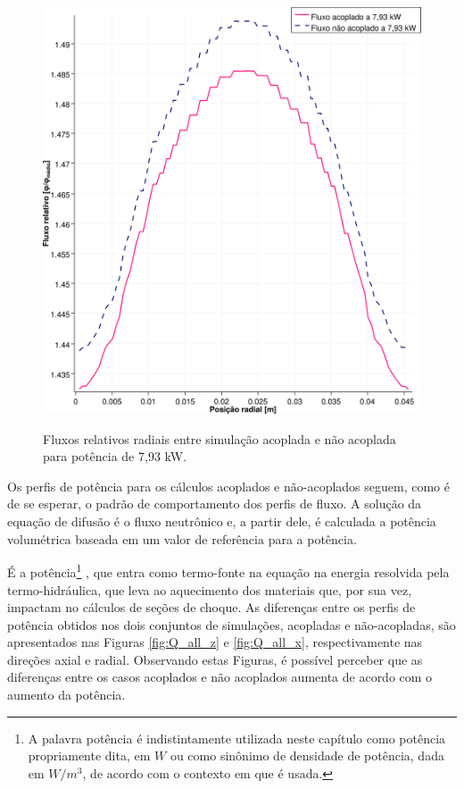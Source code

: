 \begin{figure}[htb]
  \caption{Fluxos relativos radiais entre simulação acoplada e não acoplada para
    potência de 7,93 kW.}
  \centering\includegraphics[scale=0.5]{figuras/Flux_rel_x_200_port.png}
  \label{fig:flux_x_200}
\end{figure}

Os perfis de potência para os cálculos acoplados e não-acoplados seguem, como
é de se esperar, o padrão de comportamento dos perfis de fluxo. A solução da
equação de difusão é o fluxo neutrônico e, a partir
dele, é calculada a potência volumétrica baseada em um valor de referência para
a potência.

É a potência\footnote{A palavra potência é indistintamente utilizada neste capítulo como potência
  propriamente dita, em $W$ ou como sinônimo de densidade de potência, dada em $W/m^3$, de acordo
  com o contexto em que é usada.}
, que entra como termo-fonte na equação na energia
resolvida pela termo-hidráulica, que leva ao aquecimento dos materiais que, por sua vez, impactam
no cálculos de seções de choque. As diferenças entre os perfis de potência obtidos nos dois conjuntos
de simulações, acopladas e não-acopladas, são apresentados nas Figuras \ref{fig:Q_all_z} e
\ref{fig:Q_all_x}, respectivamente nas direções axial e radial. Observando estas Figuras,
é possível perceber que as diferenças entre os casos acoplados e
não acoplados aumenta de acordo com o aumento da potência.


